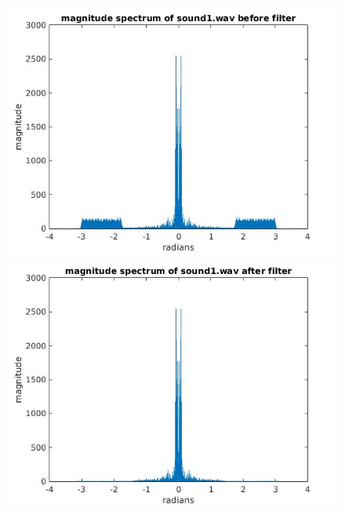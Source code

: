 \documentclass{article}
\begin{document}
\begin{figure}[H]

\end{figure}

\begin{figure}[H]
\includegraphics[scale = .5]{report6_1}
\includegraphics[scale = .5]{report6_3}
\end{figure}

\begin{figure}[H]

\end{figure}
\end{document}
